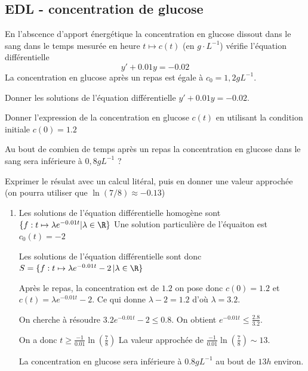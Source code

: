 \subsection{EDL - concentration de glucose}
\begin{exercice}
En l'abscence d'apport énergétique la concentration en glucose dissout dans le sang dans le temps mesurée en heure  $t\mapsto c(t)$   (en $g\cdot L^{-1}$) vérifie l'équation différentielle $$y'+0.01y= -0.02$$
La concentration en glucose après un repas est égale à $c_0=1,2gL^{-1}$.

Donner les solutions de l'équation différentielle $y'+0.01y= -0.02$.

Donner l'expression de la concentration en glucose $c(t)$ en utilisant la condition initiale $c(0) =1.2$

Au bout de combien de temps après un repas la concentration en glucose dans le sang sera inférieure à $0,8gL^{-1}$ ? 

Exprimer le résulat avec un calcul litéral, puis en donner une valeur approchée (on pourra utiliser que $\ln(7/8)  \approx -0.13$)

\end{exercice}

\begin{correction}
\begin{enumerate}
\item Les solutions de l'équation différentielle homogène sont $\{ f : t\mapsto \lambda e^{-0.01t} |\lambda\in \R\}$
Une solution particulière de l'équaiton est $c_0(t) = -2$ 

Les solutions de l'équation différentielle sont donc $S=\{ f : t\mapsto \lambda e^{-0.01t} - 2\, | \lambda\in \R\}$

Après le repas, la concentration est de $1.2$ on pose donc $c(0)=1.2$ et $c(t) =  \lambda e^{-0.01t} - 2$. Ce qui donne $\lambda -2 = 1.2 $ d'où $\lambda=3.2$. 


On cherche à résoudre $3.2e^{-0.01t} -2 \leq 0.8$. On obtient 
$e^{-0.01t} \leq \frac{2.8}{3.2}$.

On a donc $t\geq \frac{-1}{0.01}\ln(\frac{7}{8})$
La valeur approchée de $\frac{-1}{0.01}\ln(\frac{7}{8})\sim 13$. 

La concentration en glucose sera inférieure à $0.8gL^{-1}$ au bout de $13h$ environ. 



\end{enumerate}
\end{correction}








